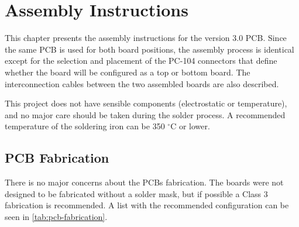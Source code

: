 %
%
%
%
%

%
%
%
%
%

\chapter{Assembly Instructions} \label{ch:assembly}

This chapter presents the assembly instructions for the version 3.0 PCB. Since the same PCB is used for both board positions, the assembly process is identical except for the selection and placement of the PC-104 connectors that define whether the board will be configured as a top or bottom board. The interconnection cables between the two assembled boards are also described.

This project does not have sensible components (electrostatic or temperature), and no major care should be taken during the solder process. A recommended temperature of the soldering iron can be 350 $^{\circ}$C or lower.

\section{PCB Fabrication}

There is no major concerns about the PCBs fabrication. The boards were not designed to be fabricated without a solder mask, but if possible a Class 3 fabrication is recommended. A list with the recommended configuration can be seen in \autoref{tab:pcb-fabrication}.

